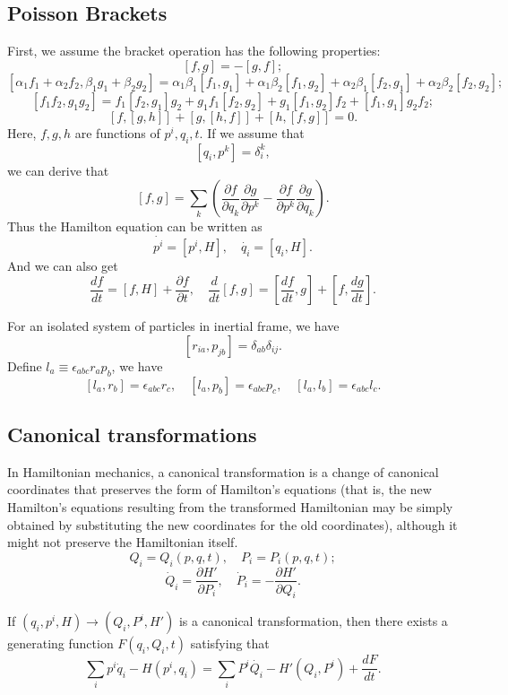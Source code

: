 \subsection{Poisson Brackets}
First, we assume the bracket operation has the following properties:
\[ \left[f,g\right]=-\left[g,f\right] ;\]
\[\left[\alpha_1 f_1+\alpha_2 f_2,\beta_1 g_1+\beta_2 g_2\right]=\alpha_1 \beta_1\left[f_1,g_1\right]
+\alpha_1 \beta_2\left[f_1,g_2\right]+\alpha_2 \beta_1\left[f_2,g_1\right]+\alpha_2 \beta_2\left[f_2,g_2\right];\]
\[\left[f_1 f_2,g_1 g_2\right]=f_1\left[f_2,g_1\right]g_2+g_1 f_1\left[f_2,g_2\right]+g_1\left[f_1,g_2\right]f_2 +\left[f_1,g_1\right]g_2 f_2 ;\]
\[\left[f,\left[g,h\right]\right]+\left[g,\left[h,f\right]\right]+\left[h,\left[f,g\right]\right]=0.\]
Here, $f,g,h$ are functions of $p^i,q_i,t$.
If we assume that
\[\left [q_i,p^k\right ]=\delta^{k}_{i},\]
we can derive that 
\[ \left[f,g\right]=\sum_k(\frac{\partial f}{\partial q_k} \frac{\partial g}{\partial p^k} - \frac{\partial f}{\partial p^k} \frac{\partial g}{\partial q_k}  ).\]
Thus the Hamilton equation can be written as
\[\dot{p^i}=\left[ p^i,H \right] , \quad \dot{q_i}=\left[ q_i,H \right].\]
And we can also get
\[\frac{df}{dt} = [f,H] + \frac{\partial f}{\partial t}, \quad \frac{d}{dt} [f,g] = [\frac{df}{dt},g] + [f,\frac{dg}{dt}].\]
\begin{example}
For an isolated system of particles in inertial frame, we have
\[[r_{ia},p_{jb}] = \delta_{ab} \delta_{ij}.\]
Define $l_a \equiv \epsilon_{abc} r_{a} p_{b}$, we have
\[[l_a,r_b] = \epsilon_{abc}r_c ,\quad [l_a,p_b] = \epsilon_{abc}p_c ,\quad [l_a,l_b] = \epsilon_{abc}l_c.\]
\end{example}

\subsection{Canonical transformations}
In Hamiltonian mechanics, a canonical transformation is a change of canonical coordinates that preserves the form of Hamilton's equations (that is, the new Hamilton's equations resulting from the transformed Hamiltonian may be simply obtained by substituting the new coordinates for the old coordinates), although it might not preserve the Hamiltonian itself. 
\[Q_i = Q_i(p,q,t) ,\quad P_i=P_i(p,q,t);\]
\[\dot{Q}_i = \frac{\partial H'}{\partial P_i} ,\quad \dot{P}_i = -\frac{\partial H'}{\partial Q_i}.\]

\begin{newprop}
If $(q_i,p^i,H) \to (Q_i,P^i,H')$ is a canonical transformation, then there exists a generating function $F(q_i,Q_i,t)$ satisfying that
\[\sum_i p^i\dot{q}_i-H(p^i,q_i) = \sum_i P^i\dot{Q_i} - H'(Q_i,P^i) + \frac{dF}{dt}.\]
\end{newprop}

